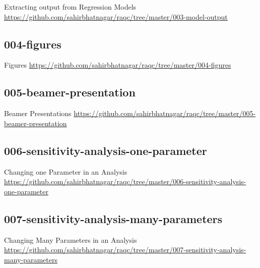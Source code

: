 \documentclass[10pt]{beamer}\usepackage[]{graphicx}\usepackage[]{color}
\begin{document}
\begin{frame}{Extracting output from Regression Models}
\href{https://github.com/sahirbhatnagar/raqc/tree/master/003-model-output}{https://github.com/sahirbhatnagar/raqc/tree/master/003-model-output}
\end{frame}


\subsection{004-figures}

\begin{frame}{Figures}
\href{https://github.com/sahirbhatnagar/raqc/tree/master/004-figures}{https://github.com/sahirbhatnagar/raqc/tree/master/004-figures}
\end{frame}


\subsection{005-beamer-presentation}

\begin{frame}{Beamer Presentations}
\href{https://github.com/sahirbhatnagar/raqc/tree/master/005-beamer-presentation}{https://github.com/sahirbhatnagar/raqc/tree/master/005-beamer-presentation}
\end{frame}


\subsection{006-sensitivity-analysis-one-parameter}

\begin{frame}{Changing one Parameter in an Analysis}
\href{https://github.com/sahirbhatnagar/raqc/tree/master/006-sensitivity-analysis-one-parameter}{https://github.com/sahirbhatnagar/raqc/tree/master/006-sensitivity-analysis-one-parameter}
\end{frame}

\subsection{007-sensitivity-analysis-many-parameters}

\begin{frame}{Changing Many Parameters in an Analysis}
\href{https://github.com/sahirbhatnagar/raqc/tree/master/007-sensitivity-analysis-many-parameters}{https://github.com/sahirbhatnagar/raqc/tree/master/007-sensitivity-analysis-many-parameters}
\end{frame}
\end{document}
